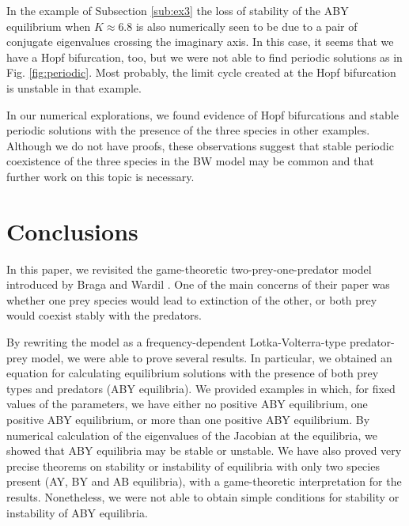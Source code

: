 \documentclass[12pt]{article}
\theoremstyle{definition}
\begin{document}
In the example of Subsection \ref{sub:ex3} the loss of stability of the ABY equilibrium when $K \approx 6.8$ is also numerically seen to be due to a pair of conjugate eigenvalues crossing the imaginary axis. In this case, it seems that we have a Hopf bifurcation, too, but we were not able to find periodic solutions as in Fig. \ref{fig:periodic}. Most probably, the limit cycle created at the Hopf bifurcation is unstable in that example.

In our numerical explorations, we found evidence of Hopf bifurcations and stable periodic solutions with the presence of the three species in other examples. Although we do not have proofs, these observations suggest that stable periodic coexistence of the three species in the BW model may be common and that further work on this topic  is necessary.

\section{Conclusions} \label{sec:conc}
In this paper, we revisited the game-theoretic two-prey-one-predator model introduced by Braga and Wardil \cite{bw}. One of the main concerns of their paper was whether one prey species would lead to extinction of the other, or both prey would coexist stably with the predators.

By rewriting the model as a frequency-dependent Lotka-Volterra-type predator-prey model, we were able to prove several results. In particular, we obtained an equation for calculating equilibrium solutions with the presence of both prey types and predators (ABY equilibria). We provided examples in which, for fixed values of the parameters, we have either no positive ABY equilibrium, one positive ABY equilibrium, or more than one positive ABY equilibrium. By numerical calculation of the eigenvalues of the Jacobian at the equilibria, we showed that ABY equilibria may be stable or unstable. We have also proved very precise theorems on stability or instability of equilibria with only two species present (AY, BY and AB equilibria), with a game-theoretic interpretation for the results. Nonetheless, we were not able to obtain simple conditions for stability or instability of ABY equilibria.
\end{document}
